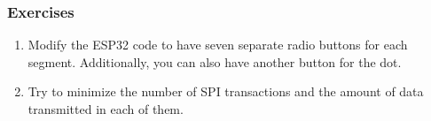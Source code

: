 \subsubsection{Exercises}
\begin{enumerate}
    \item Modify the ESP32 code to have seven separate radio buttons for each
    segment. Additionally, you can also have another button for the dot.
    \item Try to minimize the number of SPI transactions and the amount of data
    transmitted in each of them.
\end{enumerate}